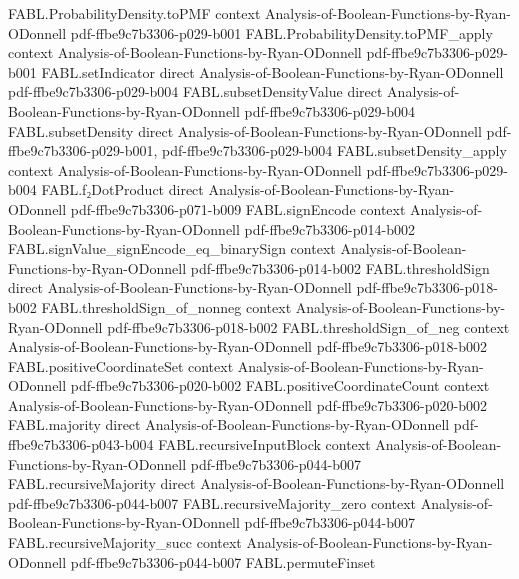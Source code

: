 \begin{theorem}
\proofstep
  {FABL.ProbabilityDensity.toPMF}
  {context}
  {Analysis-of-Boolean-Functions-by-Ryan-ODonnell}
  {pdf-ffbe9c7b3306-p029-b001}
\proofstep
  {FABL.ProbabilityDensity.toPMF_apply}
  {context}
  {Analysis-of-Boolean-Functions-by-Ryan-ODonnell}
  {pdf-ffbe9c7b3306-p029-b001}
\proofstep
  {FABL.setIndicator}
  {direct}
  {Analysis-of-Boolean-Functions-by-Ryan-ODonnell}
  {pdf-ffbe9c7b3306-p029-b004}
\proofstep
  {FABL.subsetDensityValue}
  {direct}
  {Analysis-of-Boolean-Functions-by-Ryan-ODonnell}
  {pdf-ffbe9c7b3306-p029-b004}
\proofstep
  {FABL.subsetDensity}
  {direct}
  {Analysis-of-Boolean-Functions-by-Ryan-ODonnell}
  {pdf-ffbe9c7b3306-p029-b001,
    pdf-ffbe9c7b3306-p029-b004}
\proofstep
  {FABL.subsetDensity_apply}
  {context}
  {Analysis-of-Boolean-Functions-by-Ryan-ODonnell}
  {pdf-ffbe9c7b3306-p029-b004}
\proofstep
  {FABL.f₂DotProduct}
  {direct}
  {Analysis-of-Boolean-Functions-by-Ryan-ODonnell}
  {pdf-ffbe9c7b3306-p071-b009}
\proofstep
  {FABL.signEncode}
  {context}
  {Analysis-of-Boolean-Functions-by-Ryan-ODonnell}
  {pdf-ffbe9c7b3306-p014-b002}
\proofstep
  {FABL.signValue_signEncode_eq_binarySign}
  {context}
  {Analysis-of-Boolean-Functions-by-Ryan-ODonnell}
  {pdf-ffbe9c7b3306-p014-b002}
\proofstep
  {FABL.thresholdSign}
  {direct}
  {Analysis-of-Boolean-Functions-by-Ryan-ODonnell}
  {pdf-ffbe9c7b3306-p018-b002}
\proofstep
  {FABL.thresholdSign_of_nonneg}
  {context}
  {Analysis-of-Boolean-Functions-by-Ryan-ODonnell}
  {pdf-ffbe9c7b3306-p018-b002}
\proofstep
  {FABL.thresholdSign_of_neg}
  {context}
  {Analysis-of-Boolean-Functions-by-Ryan-ODonnell}
  {pdf-ffbe9c7b3306-p018-b002}
\proofstep
  {FABL.positiveCoordinateSet}
  {context}
  {Analysis-of-Boolean-Functions-by-Ryan-ODonnell}
  {pdf-ffbe9c7b3306-p020-b002}
\proofstep
  {FABL.positiveCoordinateCount}
  {context}
  {Analysis-of-Boolean-Functions-by-Ryan-ODonnell}
  {pdf-ffbe9c7b3306-p020-b002}
\proofstep
  {FABL.majority}
  {direct}
  {Analysis-of-Boolean-Functions-by-Ryan-ODonnell}
  {pdf-ffbe9c7b3306-p043-b004}
\proofstep
  {FABL.recursiveInputBlock}
  {context}
  {Analysis-of-Boolean-Functions-by-Ryan-ODonnell}
  {pdf-ffbe9c7b3306-p044-b007}
\proofstep
  {FABL.recursiveMajority}
  {direct}
  {Analysis-of-Boolean-Functions-by-Ryan-ODonnell}
  {pdf-ffbe9c7b3306-p044-b007}
\proofstep
  {FABL.recursiveMajority_zero}
  {context}
  {Analysis-of-Boolean-Functions-by-Ryan-ODonnell}
  {pdf-ffbe9c7b3306-p044-b007}
\proofstep
  {FABL.recursiveMajority_succ}
  {context}
  {Analysis-of-Boolean-Functions-by-Ryan-ODonnell}
  {pdf-ffbe9c7b3306-p044-b007}
\proofstep
  {FABL.permuteFinset}

\end{theorem}
